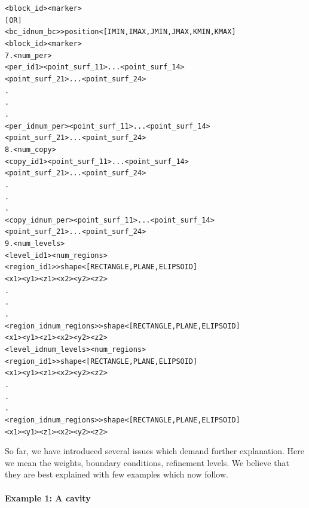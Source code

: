 \documentclass[10pt]{article}
\begin{document}
\begin{alltt}
               <block_id>  <marker>
            [OR]  
            <bc_id num_bc> >position< [IMIN,IMAX,JMIN,JMAX,KMIN,KMAX]   
               <block_id>  <marker>
    7. <num_per> 
            <per_id 1>  <point_surf_1 1> ... <point_surf_1 4> 
                        <point_surf_2 1> ... <point_surf_2 4> 
               .
               .
               . 
            <per_id num_per>  <point_surf_1 1> ... <point_surf_1 4> 
                              <point_surf_2 1> ... <point_surf_2 4> 
    8. <num_copy> 
            <copy_id 1>  <point_surf_1 1> ... <point_surf_1 4> 
                         <point_surf_2 1> ... <point_surf_2 4> 
               .
               .
               . 
            <copy_id num_per>  <point_surf_1 1> ... <point_surf_1 4> 
                               <point_surf_2 1> ... <point_surf_2 4> 
    9. <num_levels> 
            <level_id 1>  <num_regions>
               <region_id 1>  >shape<  [RECTANGLE,PLANE,ELIPSOID]  
                   <x1>  <y1>  <z1>  <x2>  <y2>  <z2>
               . 
               .
               .
               <region_id num_regions>  >shape<  [RECTANGLE,PLANE,ELIPSOID] 
                   <x1>  <y1>  <z1>  <x2>  <y2>  <z2>
            <level_id num_levels>  <num_regions>
               <region_id 1>  >shape<  [RECTANGLE,PLANE,ELIPSOID]  
                   <x1>  <y1>  <z1>  <x2>  <y2>  <z2>
               . 
               .
               .
               <region_id num_regions>  >shape<  [RECTANGLE,PLANE,ELIPSOID]  
                   <x1>  <y1>  <z1>  <x2>  <y2>  <z2>
    \end{alltt}
    \normalsize
    So far, we have introduced several issues which demand
    further explanation. Here we mean the weights, boundary
    conditions, refinement levels. We believe that they are
    best explained with few examples which now follow.

    \paragraph{Example 1: A cavity}
\end{document}
